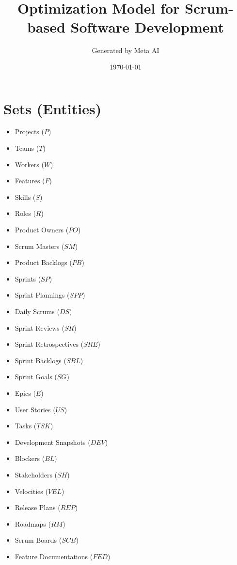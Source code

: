 \documentclass{article}
\title{Optimization Model for Scrum-based Software Development}
\author{Generated by Meta AI}
\date{\today}
\begin{document}
\maketitle
\tableofcontents

\section{Sets (Entities)}
\begin{itemize}
    \item Projects ($P$)
    \item Teams ($T$)
    \item Workers ($W$)
    \item Features ($F$)
    \item Skills ($S$)
    \item Roles ($R$)
    \item Product Owners ($PO$)
    \item Scrum Masters ($SM$)
    \item Product Backlogs ($PB$)
    \item Sprints ($SP$)
    \item Sprint Plannings ($SPP$)
    \item Daily Scrums ($DS$)
    \item Sprint Reviews ($SR$)
    \item Sprint Retrospectives ($SRE$)
    \item Sprint Backlogs ($SBL$)
    \item Sprint Goals ($SG$)
    \item Epics ($E$)
    \item User Stories ($US$)
    \item Tasks ($TSK$)
    \item Development Snapshots ($DEV$)
    \item Blockers ($BL$)
    \item Stakeholders ($SH$)
    \item Velocities ($VEL$)
    \item Release Plans ($REP$)
    \item Roadmaps ($RM$)
    \item Scrum Boards ($SCB$)
    \item Feature Documentations ($FED$)
\end{itemize}
\end{document}
